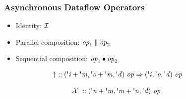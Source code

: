 \documentclass[fleqn,aspectratio=169,10pt]{beamer}
\begin{document}
\begin{frame}[fragile]
  \frametitle{Asynchronous Dataflow Operators}
  \begin{itemize}
    \item Identity: $\mathcal{I}$
    \item Parallel composition: ${\mathrm{\mathit{op}}_1} \parallel {\mathrm{\mathit{op}}_2}$
    \item Sequential composition: ${\mathrm{\mathit{op}}_1} \bullet {\mathrm{\mathit{op}}_2}$
  \end{itemize}
  \pause

  \begin{tcbraster}[raster columns=2, raster equal height]
  \begin{tcolorbox}[enhanced,title=Feedback operator type ($\Feedback{op}$) ,colback=yellow!30]
    \vspace*{-7ex}
    \hspace*{-8ex}
    \begin{align*}
      & \hspace*{-6ex} \Feedback{} \ \oftype \type{(\tvar{i} + \tvar{m}, \tvar{o} + \tvar{m}, \tvar{d}) \ op \Fun (\tvar{i}, \tvar{o}, \tvar{d}) \ op}
    \end{align*}
    \vspace*{-6ex}
  \end{tcolorbox}
  \pause
  \begin{tcolorbox}[enhanced,title=Transpose operator type,colback=yellow!30]
    \vspace*{-7ex}
    \hspace*{-8ex}
    \begin{align*}
      & \hspace*{-6ex} \TranspOp \ \oftype \type{(\tvar{n} + \tvar{m}, \tvar{m} + \tvar{n}, \tvar{d}) \ op}
    \end{align*}
    \vspace*{-6ex}
  \end{tcolorbox}
  \end{tcbraster}
  \pause


\end{frame}
\end{document}
